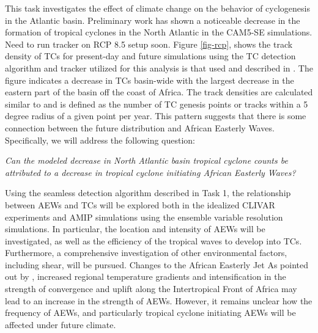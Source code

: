 \documentclass[11pt]{article}
\begin{document}
This task investigates the effect of climate change on the behavior of cyclogenesis in the Atlantic basin.  Preliminary work has shown a noticeable decrease in the formation of tropical cyclones in the North Atlantic in the CAM5-SE simulations. {\color{red} Need to run tracker on RCP 8.5 setup soon}. Figure \ref{fig-rcp}, shows the track density of TCs for present-day and future simulations using the TC detection algorithm and tracker utilized for this analysis is that used and described in \citet{Zhao2009}. The figure indicates a decrease in TCs basin-wide with the largest decrease in the eastern part of the basin off the coast of Africa. The track densities are calculated similar to \citet{Done2013} and is defined as the number of TC genesis points or tracks within a 5 degree radius of a given point per year. This pattern suggests that there is some connection between the future distribution and African Easterly Waves.  Specifically, we will address the following question:

\textit{Can the modeled decrease in North Atlantic basin tropical cyclone counts be attributed to a decrease in tropical cyclone initiating African Easterly Waves?}

Using the seamless detection algorithm described in Task 1, the relationship between AEWs and TCs will be explored both in the idealized CLIVAR experiments and AMIP simulations using the ensemble variable resolution simulations. In particular, the location and intensity of AEWs will be investigated, as well as the efficiency of the tropical waves to develop into TCs.  Furthermore, a comprehensive investigation of other environmental factors, including shear, will be pursued. Changes to the African Easterly Jet As pointed out by \cite{skinner2013contribution}, increased regional temperature gradients and intensification in the strength of convergence and uplift along the Intertropical Front of Africa may lead to an increase in the strength of AEWs.  However, it remains unclear how the frequency of AEWs, and particularly tropical cyclone initiating AEWs will be affected under future climate.
\end{document}
